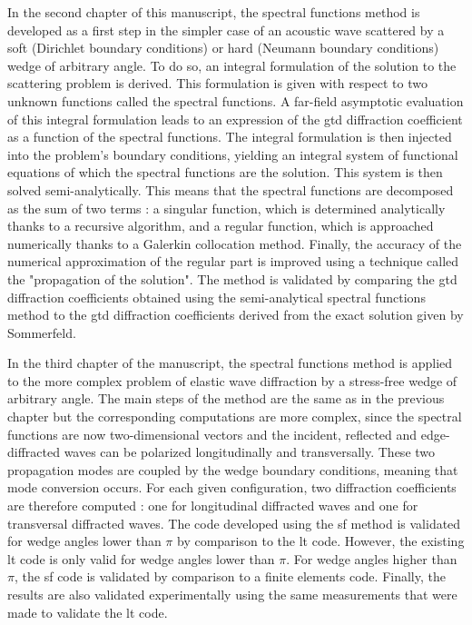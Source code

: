 In the second chapter of this manuscript, the spectral functions method is developed as a first step in the simpler case of an acoustic wave scattered by a soft (Dirichlet boundary conditions) or hard (Neumann boundary conditions) wedge of arbitrary angle. To do so, an integral formulation of the solution to the scattering problem is derived. This formulation is given with respect to two unknown functions called the spectral functions. A far-field asymptotic evaluation of this integral formulation leads to an expression of the \acrshort{gtd} diffraction coefficient as a function of the spectral functions. The integral formulation is then injected into the problem's boundary conditions, yielding an integral system of functional equations of which the spectral functions are the solution. This system is then solved semi-analytically. This means that the spectral functions are decomposed as the sum of two terms : a singular function, which is determined analytically thanks to a recursive algorithm, and a regular function, which is approached numerically thanks to a Galerkin collocation method. Finally, the accuracy of the numerical approximation of the regular part is improved using a technique called the "propagation of the solution". The method is validated by comparing the \acrshort{gtd} diffraction coefficients obtained using the semi-analytical spectral functions method to the \acrshort{gtd} diffraction coefficients derived from the exact solution given by Sommerfeld.

In the third chapter of the manuscript, the spectral functions method is applied to the more complex problem of elastic wave diffraction by a stress-free wedge of arbitrary angle. The main steps of the method are the same as in the previous chapter but the corresponding computations are more complex, since the spectral functions are now two-dimensional vectors and the incident, reflected and edge-diffracted waves can be polarized longitudinally and transversally. These two propagation modes are coupled by the wedge boundary conditions, meaning that mode conversion occurs. For each given configuration, two diffraction coefficients are therefore computed : one for longitudinal diffracted waves and one for transversal diffracted waves. The code developed using the \acrfull{sf} method is validated for wedge angles lower than $\pi$ by comparison to the \acrfull{lt} code. However, the existing \acrshort{lt} code is only valid for wedge angles lower than $\pi$. For wedge angles higher than $\pi$, the \acrshort{sf} code is validated by comparison to a finite elements code. Finally, the results are also validated experimentally using the same measurements that were made to validate the \acrshort{lt} code.

